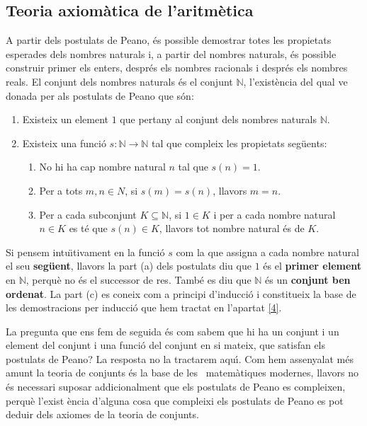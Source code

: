 \subsection{Teoria axiom\`{a}tica de l'aritm\`{e}tica}

A partir dels postulats de Peano, \'{e}s possible demostrar totes les
propietats esperades dels nombres naturals i, a partir del nombres naturals,
\'{e}s possible construir primer els enters, despr\'{e}s els nombres
racionals i despr\'{e}s els nombres reals. El conjunt dels nombres naturals
\'{e}s el conjunt $\mathbb{N}$, l'exist\`{e}ncia del qual ve donada per als
postulats de Peano que s\'{o}n:

\begin{enumerate}
\item Existeix un element $1$ que pertany al conjunt dels nombres naturals $%
\mathbb{N}$.

\item Existeix una funci\'{o} $s:\mathbb{N}\longrightarrow\mathbb{N}$ tal
que compleix les propietats seg\"{u}ents:

\begin{enumerate}
\item No hi ha cap nombre natural $n$ tal que $s(n)=1.$

\item Per a tots $m,n\in N$, si $s(m)=s(n)$, llavors $m=n$.

\item Per a cada subconjunt $K\subseteq\mathbb{N}$, si $1\in K$ i per a cada
nombre natural $n\in K$ es t\'{e} que $s(n)\in K$, llavors tot nombre
natural \'{e}s de $K$.
\end{enumerate}
\end{enumerate}

Si pensem intu\"{\i}tivament en la funci\'{o} $s$ com la que assigna a cada
nombre natural el seu \textbf{seg\"{u}ent}, llavors la part (a) dels
postulats diu que $1$ \'{e}s el \textbf{primer element} en $\mathbb{N}$,
perqu\`{e} no \'{e}s el successor de res. Tamb\'{e} es diu que $\mathbb{N}$
\'{e}s un \textbf{conjunt ben ordenat}. La part (c) es coneix com a principi
d'inducci\'{o} i constitueix la base de les demostracions per inducci\'{o}
que hem tractat en l'apartat \ref{4}.

\bigskip

La pregunta que ens fem de seguida \'{e}s com sabem que hi ha un conjunt i
un element del conjunt i una funci\'{o} del conjunt en si mateix, que
satisfan els postulats de Peano? La resposta no la tractarem aqu\'{\i}. Com
hem assenyalat m\'{e}s amunt la teoria de conjunts \'{e}s la base de les \
matem\`{a}tiques modernes, llavors no \'{e}s necessari suposar
addicionalment que els postulats de Peano es compleixen, perqu\`{e} l'exist%
\`{e}ncia d'alguna cosa que compleixi els postulats de Peano es pot deduir
dels axiomes de la teoria de conjunts.

